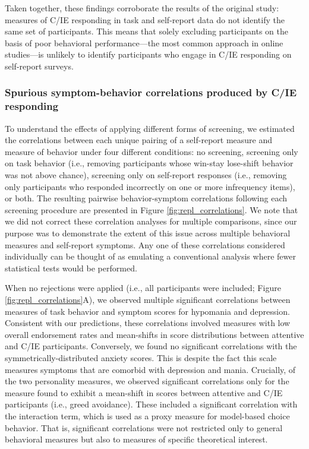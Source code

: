 \documentclass[a4paper,notitlepage,12pt]{article}
\begin{document}
\begin{refsection}[supp]
Taken together, these findings corroborate the results of the original study: measures of C/IE responding in task and self-report data do not identify the same set of participants. This means that solely excluding participants on the basis of poor behavioral performance---the most common approach in online studies---is unlikely to identify participants who engage in C/IE responding on self-report surveys. 

\subsubsection*{Spurious symptom-behavior correlations produced by C/IE responding}

To understand the effects of applying different forms of screening, we estimated the correlations between each unique pairing of a self-report measure and measure of behavior under four different conditions: no screening, screening only on task behavior (i.e., removing participants whose win-stay lose-shift behavior was not above chance), screening only on self-report responses (i.e., removing only participants who responded incorrectly on one or more infrequency items), or both. The resulting pairwise behavior-symptom correlations following each screening procedure are presented in Figure \ref{fig:repl_correlations}. We note that we did not correct these correlation analyses for multiple comparisons, since our purpose was to demonstrate the extent of this issue across multiple behavioral measures and self-report symptoms. Any one of these correlations considered individually can be thought of as emulating a conventional analysis where fewer statistical tests would be performed.

When no rejections were applied (i.e., all participants were included; Figure \ref{fig:repl_correlations}A), we observed multiple significant correlations between measures of task behavior and symptom scores for hypomania and depression. Consistent with our predictions, these correlations involved measures with low overall endorsement rates and mean-shifts in score distributions between attentive and C/IE participants. Conversely, we found no significant correlations with the symmetrically-distributed anxiety scores. This is despite the fact this scale measures symptoms that are comorbid with depression and mania. Crucially, of the two personality measures, we observed significant correlations only for the measure found to exhibit a mean-shift in scores between attentive and C/IE participants (i.e., greed avoidance). These included a significant correlation with the interaction term, which is used as a proxy measure for model-based choice behavior. That is, significant correlations were not restricted only to general behavioral measures but also to measures of specific theoretical interest.


\end{refsection}
\end{document}
